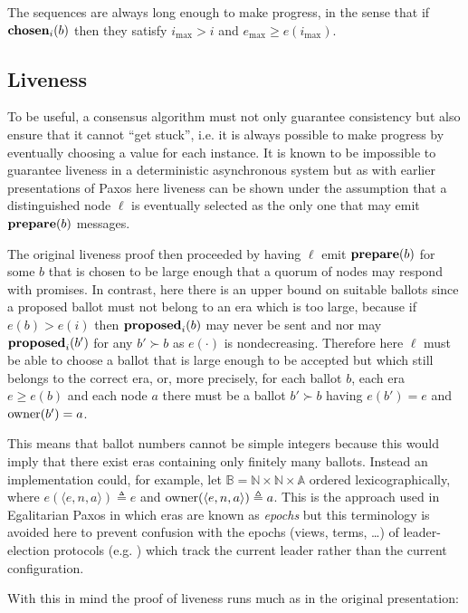 \documentclass[journal]{IEEEtran}
\begin{document}
The sequences are always long enough to make progress, in the sense that if
$\mathbf{chosen}_{i}(b)$ then they satisfy $i_\mathrm{max} > i$ and $e_\mathrm{max} \ge
e(i_\mathrm{max})$.


\subsection{Liveness}\label{liveness}

To be useful, a consensus algorithm must not only guarantee consistency but
also ensure that it cannot ``get stuck'', i.e. it is always possible to make
progress by eventually choosing a value for each instance. It is known to be
impossible to guarantee liveness in a deterministic asynchronous
system\cite{flp-impossibility} but as with earlier presentations of
Paxos\cite{paxos-made-simple} here liveness can be shown under the assumption
that a distinguished node $\ell$ is eventually selected as the only one that
may emit $\mathbf{prepare}(b)$ messages.

The original liveness proof then proceeded by having $\ell$ emit $\mathbf{prepare}(b)$ for
some $b$ that is chosen to be large enough that a quorum of nodes may respond
with promises. In contrast, here there is an upper bound on suitable ballots
since a proposed ballot must not belong to an era which is too large, because
if ${e(b) > e(i)}$ then $\mathbf{proposed}_{i}(b)$ may never be sent and nor may
$\mathbf{proposed}_{i}(b')$ for any $b' \succ b$ as $e(\cdot)$ is nondecreasing.  Therefore
here $\ell$ must be able to choose a ballot that is large enough to be accepted
but which still belongs to the correct era, or, more precisely, for each ballot
$b$, each era $e \ge e(b)$ and each node $a$ there must be a ballot $b' \succ
b$ having $e(b') = e$ and $\mathrm{owner}(b') = a$.

This means that ballot numbers cannot be simple integers because this would
imply that there exist eras containing only finitely many ballots. Instead an
implementation could, for example, let $\mathbb B = \mathbb N \times \mathbb N
\times \mathbb A$ ordered lexicographically, where $e(\langle e, n, a\rangle)
\triangleq e$ and $\mathrm{owner}(\langle e, n, a \rangle) \triangleq a$. This is the
approach used in Egalitarian Paxos\cite{egalitarian-paxos} in which eras are
known as \textit{epochs} but this terminology is avoided here to prevent
confusion with the epochs (views, terms, \ldots) of leader-election protocols
(e.g.  \cite{omega-meets-paxos}) which track the current leader rather than the
current configuration.

With this in mind the proof of liveness runs much as in the original
presentation:
\end{document}
